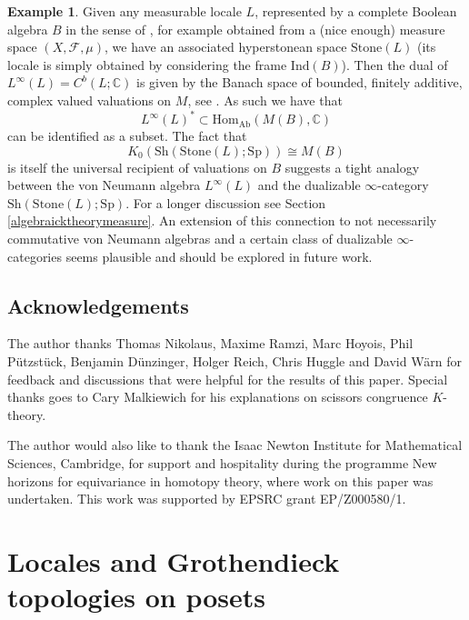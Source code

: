 \documentclass[10pt]{amsart}
\theoremstyle{definition}
\newtheorem{example}[theorem]{Example}
\begin{document}
\begin{example}
Given any measurable locale $L$, represented by a complete Boolean algebra $B$ in the sense of \cite{Pavlov_2022}, for example obtained from a (nice enough) measure space $(X,\mathcal{F}, \mu)$, we have an associated hyperstonean space $\mathrm{Stone}(L)$ (its locale is simply obtained by considering the frame $\mathrm{Ind}(B)$). Then the dual of $L^\infty(L) = C^b(L;\mathbb{C})$ is given by the Banach space of bounded, finitely additive, complex valued valuations on $M$, see \cite{Toland2020}. As such we have that 
$$L^\infty(L)^* \subset \mathrm{Hom}_{\mathrm{Ab}}( M(B), \mathbb{C} )$$
can be identified as a subset. The fact that
$$K_0(\mathrm{Sh}(\mathrm{Stone}(L);\mathrm{Sp}) ) \cong M(B)$$
is itself the universal recipient of valuations on $B$
suggests a tight analogy between the von Neumann algebra $L^\infty(L)$ and the dualizable $\infty$-category $\mathrm{Sh}(\mathrm{Stone}(L);\mathrm{Sp})$. For a longer discussion see Section \ref{algebraicktheorymeasure}. An extension of this connection to not necessarily commutative von Neumann algebras and a certain class of dualizable $\infty$-categories seems plausible and should be explored in future work.
\end{example}


\subsection{Acknowledgements}

The author thanks Thomas Nikolaus, Maxime Ramzi, Marc Hoyois, Phil Pützstück, Benjamin Dünzinger, Holger Reich, Chris Huggle and David Wärn for feedback and discussions that were helpful for the results of this paper. Special thanks goes to Cary Malkiewich for his explanations on scissors congruence $K$-theory.

The author would also like to thank the Isaac Newton Institute for Mathematical Sciences, Cambridge, for support and hospitality during the programme New horizons for equivariance in homotopy theory, where work on this paper was undertaken. This work was supported by EPSRC grant EP/Z000580/1.

\section{Locales and Grothendieck topologies on posets}
\end{document}
